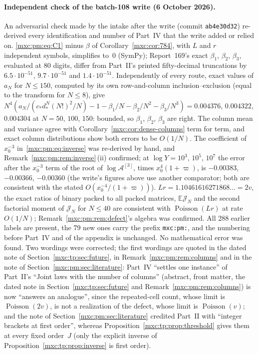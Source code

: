 \documentclass[11pt]{article}
\numberwithin{equation}{section}
\theoremstyle{definition}
\theoremstyle{remark}
\newcommand{\E}{\mathbb E}
\DeclareMathOperator{\Pois}{Poisson}
\begin{document}
\paragraph{Independent check of the batch-108 write (6 October 2026).} An
adversarial check made by the intake after the write (commit
\texttt{ab4e30d32}) re-derived every identification and number of Part~IV
that the write added or relied on. \eqref{mxc:pm:eq:C1} minus $\beta$ of
Corollary~\ref{mxc:cor:784}, with $L$ and $r$ independent symbols, simplifies
to~$0$ (SymPy); Report~169's exact $\beta_1$, $\beta_2$, $\beta_3$, evaluated
at 80 digits, differ from Part~II's printed fifty-decimal truncations by
$6.5\cdot10^{-51}$, $9.7\cdot10^{-51}$ and $1.4\cdot10^{-51}$. Independently
of every route, exact values of $a_N$ for $N\le150$, computed by its own
row-and-column inclusion--exclusion (equal to the transform for $N\le8$),
give $N^4(a_N/(c_\ast d_\ast^N(N!)^2/N)-1-\beta_1/N-\beta_2/N^2-\beta_3/N^3)
=0.004376$, $0.004322$, $0.004304$ at $N=50$, $100$, $150$: bounded, so
$\beta_1$, $\beta_2$, $\beta_3$ are right. The column mean and variance agree
with Corollary~\ref{mxc:cor:dense-columns} term for term, and exact column
distributions show both errors to be $O(1/N)$. The coefficient of $x_0^{-3}$
in~\eqref{mxc:pm:eq:inverse} was re-derived by hand, and Remark~\ref{mxc:pm:rem:inverse}\,(ii)
confirmed; at $\log Y=10^3$, $10^5$, $10^7$ the error after the $x_0^{-3}$
term of the root of $\log\mathcal A^{[3]}$, times $x_0^4(1+\varpi)$, is
$-0.00383$, $-0.00366$, $-0.00360$ (the write's figures above use another
comparator; both are consistent with the stated $O(x_0^{-4}/(1+\varpi))$).
$Lr=1.10461616271868\ldots=2v$, the exact ratios of binary packed to all
packed matrices, $\E\mathcal J_N$ and the second factorial moment of
$\mathcal J_N$ for $N\le40$ are consistent with $\Pois(Lr)$ at rate $O(1/N)$;
Remark~\ref{mxc:pm:rem:defect}'s algebra was confirmed. All 288 earlier
labels are present, the 79 new ones carry the prefix \texttt{mxc:pm:}, and the
numbering before Part~IV and of the appendix is unchanged. No mathematical
error was found. Two wordings were corrected; the first wordings are quoted
in the dated note of Section~\ref{mxc:tp:sec:future}, in
Remark~\ref{mxc:pm:rem:columns} and in the note of
Section~\ref{mxc:pm:sec:literature}: Part~IV ``settles one instance'' of Part~II's ``Joint laws
with the number of columns'' (abstract, front matter, the dated note in
Section~\ref{mxc:tp:sec:future} and Remark~\ref{mxc:pm:rem:columns}) is now
``answers an analogue'', since the repeated-cell count, whose limit is
$\Pois(2v)$, is not a realization of the defect, whose limit is $\Pois(v)$;
and the note of Section~\ref{mxc:pm:sec:literature} credited Part~II with
``integer brackets at first order'', whereas
Proposition~\ref{mxc:tp:prop:threshold} gives them at every fixed order~$J$
(only the explicit inverse of Proposition~\ref{mxc:tp:prop:inverse} is first
order).
\end{document}
